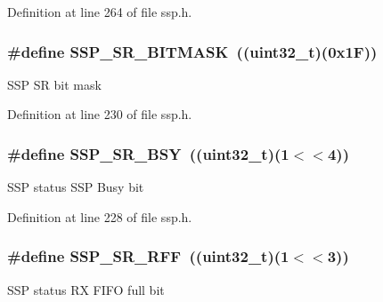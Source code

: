 Definition at line 264 of file ssp.\+h.

\subsubsection[{\texorpdfstring{S\+S\+P\+\_\+\+S\+R\+\_\+\+B\+I\+T\+M\+A\+SK}{SSP_SR_BITMASK}}]{\setlength{\rightskip}{0pt plus 5cm}\#define S\+S\+P\+\_\+\+S\+R\+\_\+\+B\+I\+T\+M\+A\+SK~(({\bf uint32\+\_\+t})(0x1\+F))}\hypertarget{group___s_s_p___private___macros_ga0fe66130dd87296b6e16cd9fbcf7daf1}{}\label{group___s_s_p___private___macros_ga0fe66130dd87296b6e16cd9fbcf7daf1}
S\+SP SR bit mask 

Definition at line 230 of file ssp.\+h.

\subsubsection[{\texorpdfstring{S\+S\+P\+\_\+\+S\+R\+\_\+\+B\+SY}{SSP_SR_BSY}}]{\setlength{\rightskip}{0pt plus 5cm}\#define S\+S\+P\+\_\+\+S\+R\+\_\+\+B\+SY~(({\bf uint32\+\_\+t})(1$<$$<$4))}\hypertarget{group___s_s_p___private___macros_gac57c889d98458cfbde35f0ab63b499c2}{}\label{group___s_s_p___private___macros_gac57c889d98458cfbde35f0ab63b499c2}
S\+SP status S\+SP Busy bit 

Definition at line 228 of file ssp.\+h.

\subsubsection[{\texorpdfstring{S\+S\+P\+\_\+\+S\+R\+\_\+\+R\+FF}{SSP_SR_RFF}}]{\setlength{\rightskip}{0pt plus 5cm}\#define S\+S\+P\+\_\+\+S\+R\+\_\+\+R\+FF~(({\bf uint32\+\_\+t})(1$<$$<$3))}\hypertarget{group___s_s_p___private___macros_gacb3442f8b9ec2dbb3be63f154cc58940}{}\label{group___s_s_p___private___macros_gacb3442f8b9ec2dbb3be63f154cc58940}
S\+SP status RX F\+I\+FO full bit 

